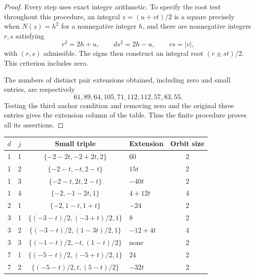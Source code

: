 \documentclass[12pt]{article}
\numberwithin{equation}{section}
\begin{document}
\begin{proof}
Every step uses exact integer arithmetic. To specify the root test throughout this procedure, an integral $z=(u+vt)/2$ is a square precisely when $N(z)=h^2$ for a nonnegative integer $h$, and there are nonnegative integers $r,s$ satisfying
\[
 r^2=2h+u,\qquad ds^2=2h-u,\qquad rs=|v|,
\]
with $(r,s)$ admissible. The signs then construct an integral root $(r\pm st)/2$. This criterion includes zero.

The numbers of distinct pair extensions obtained, including zero and small entries, are respectively
\[
 61,89,64,105,71,112,112,57,83,55.
\]
Testing the third anchor condition and removing zero and the original three entries gives the extension column of the table. Thus the finite procedure proves all its assertions.
\end{proof}

\par\medskip
\noindent\begin{minipage}{\textwidth}
\makeatletter{}\makeatother
\centering
\begin{tabular}{ccclc}
\toprule
$d$&$j$&Small triple&Extension&Orbit size\\
\midrule
1&1&$\{-2-2t,-2+2t,2\}$&$60$&2\\
1&2&$\{-2-t,-t,2-t\}$&$15t$&2\\
1&3&$\{-2-t,2t,2-t\}$&$-40t$&2\\
1&4&$\{-2,-1-2t,1\}$&$4+12t$&4\\
2&1&$\{-2,1-t,1+t\}$&$-24$&2\\
3&1&$\{(-3-t)/2,(-3+t)/2,1\}$&$8$&2\\
3&2&$\{(-3-t)/2,(1-3t)/2,1\}$&$-12+4t$&4\\
3&3&$\{(-1-t)/2,-t,(1-t)/2\}$&none&2\\
7&1&$\{(-5-t)/2,(-5+t)/2,1\}$&$24$&2\\
7&2&$\{(-5-t)/2,t,(5-t)/2\}$&$-32t$&2\\
\bottomrule
\end{tabular}
\caption{Small triples and all their further nonzero extensions of modulus at most $10^{40}$. Here $t=\sqrt{-d}$.}
\label{sm:six-small-triples-table}
\end{minipage}\par\medskip
\end{document}
